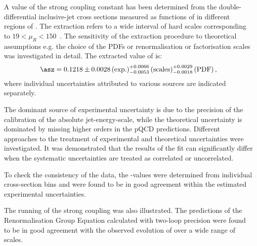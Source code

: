 A value of the strong coupling constant has been determined from the double-differential inclusive-jet cross sections measured as functions of \etjetb in different regions of \qsq. The extraction refers to a wide interval of hard scales corresponding to $19 < \mu_R < 150$~\GeV. The sensitivity of the extraction procedure to theoretical assumptions e.g. the choice of the PDFs or renormalisation or factorisation scales was investigated in detail. The extracted value of \asz is:
\begin{equation}
 \asz = 0.1218 \pm 0.0028\left(\text{exp.}\right)^{+0.0066}_{-0.0053}\left(\text{scales}\right)^{+0.0029}_{-0.0018}\left(\text{PDF}\right),
\end{equation}
where individual uncertainties attributed to various sources are indicated separately. 

The dominant source of experimental uncertainty is due to the precision of the calibration of the absolute jet-energy-scale, while the theoretical uncertainty is dominated by missing higher orders in the pQCD predictions.
Different approaches to the treatment of experimental and theoretical uncertainties were investigated. It was demonstrated that the results of the fit can significantly differ when the systematic uncertainties are treated as correlated or uncorrelated.

To check the consistency of the data, the \asz-values were determined from individual cross-section bins and were found to be in good agreement within the estimated experimental uncertainties.

The running of the strong coupling was also illustrated. The predictions of the Renormalisation Group Equation calculated with two-loop precision were found to be in good agreement with the observed evolution of \as over a wide range of scales.